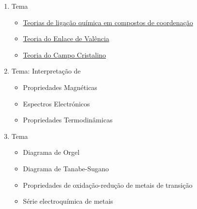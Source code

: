\documentclass{article}
\begin{document}
{\begin{multicols}{2}
\begin{enumerate}
\begin{itemize}[leftmargin=0mm]
		\item \hyperref[efeito de quelacao]
					{Efeito de Quelação}
					
		\item \hyperref[numero medio de ligandos]
			 {Números de Coordenação mais prováveis
			 em compostos de coordenação}
			 
		\item \hyperref[isomeria]
					{Isomeria}
	
	\end{itemize}
	
	
	\item Tema
	\begin{itemize}[leftmargin=0mm]
	
		\item \hyperref[orbitais moleculares]
			 {Teorias de ligação química
			 em compostos de coordenação}
			 
		\item \hyperref[enlace de valencia]
					{Teoria do Enlace de Valência}
					
		\item \hyperref[campo cristalino]
					{Teoria do Campo Cristalino}
	
	\end{itemize}
	
	
	\item Tema: Interpretação de
	\begin{itemize}[leftmargin=0mm]
		
		\item Propriedades Magnéticas
		\item Espectros Electrónicos
		\item Propriedades Termodinâmicas
		
	\end{itemize}
	
	
	\item Tema
	\begin{itemize}[leftmargin=0mm]
		
		\item Diagrama de Orgel
		\item Diagrama de Tanabe-Sugano
		\item Propriedades de oxidação-redução
			 de metais de transição
		\item Série electroquímica de metais
		

\end{itemize}
\end{enumerate}
\end{multicols}}
\end{document}
